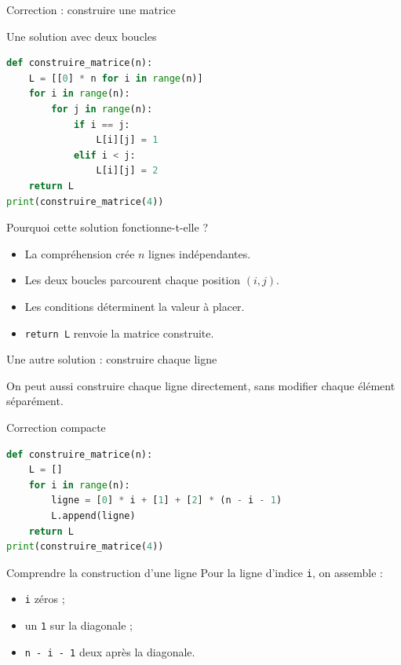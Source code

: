 \documentclass[10pt]{beamer}
\begin{document}
\begin{frame}[fragile]{Correction : construire une matrice}

\begin{exampleblock}{Une solution avec deux boucles}
\begin{lstlisting}[language=Python]
def construire_matrice(n):
    L = [[0] * n for i in range(n)]
    for i in range(n):
        for j in range(n):
            if i == j:
                L[i][j] = 1
            elif i < j:
                L[i][j] = 2
    return L
print(construire_matrice(4))
\end{lstlisting}
\end{exampleblock}

\pause

\begin{block}{Pourquoi cette solution fonctionne-t-elle ?}
\begin{itemize}
    \item La compréhension crée $n$ lignes indépendantes.
    \item Les deux boucles parcourent chaque position $(i,j)$.
    \item Les conditions déterminent la valeur à placer.
    \item \texttt{return L} renvoie la matrice construite.
\end{itemize}
\end{block}

\end{frame}


\begin{frame}[fragile]{Une autre solution : construire chaque ligne}

On peut aussi construire chaque ligne directement, sans modifier
chaque élément séparément.

\begin{exampleblock}{Correction compacte}
\begin{lstlisting}[language=Python]
def construire_matrice(n):
    L = []
    for i in range(n):
        ligne = [0] * i + [1] + [2] * (n - i - 1)
        L.append(ligne)
    return L
print(construire_matrice(4))
\end{lstlisting}
\end{exampleblock}

\pause

\begin{block}{Comprendre la construction d'une ligne}
Pour la ligne d'indice \texttt{i}, on assemble :
\begin{itemize}
    \item \texttt{i} zéros ;
    \item un \texttt{1} sur la diagonale ;
    \item \texttt{n - i - 1} deux après la diagonale.
\end{itemize}
\end{block}

\end{frame}
\end{document}
